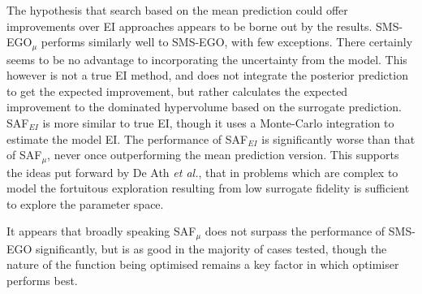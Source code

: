 \documentclass[conference]{IEEEtran}
\makeatletter
\newcommand\safmu{SAF$_{\mu}$\xspace}
\newcommand\safei{SAF$_{EI}$\xspace}
\newcommand\smsego{SMS-EGO\xspace}
\newcommand\smsegomu{SMS-EGO$_{\mu}$\xspace}
\newcommand\ei{EI\xspace}
\newcommand*{\etal}{\textit{et al.}\@\xspace}
\makeatother
\begin{document}
The hypothesis that search based on the mean prediction could offer improvements over \ei approaches appears to be borne out by the results. \smsegomu performs similarly well to \smsego, with few exceptions. There certainly seems to be no advantage to incorporating the uncertainty from the model. This however is not a true \ei method, and does not integrate the posterior prediction to get the expected improvement, but rather calculates the expected improvement to the dominated hypervolume based on the surrogate prediction. \safei is more similar to true \ei, though it uses a Monte-Carlo integration to estimate the model \ei. The performance of \safei is significantly worse than that of \safmu, never once outperforming the mean prediction version. This supports the ideas put forward by De Ath \etal \cite{death2019greed}, that in problems which are complex to model the fortuitous exploration resulting from low surrogate fidelity is sufficient to explore the parameter space.

It appears that broadly speaking \safmu does not surpass the performance of \smsego significantly, but is as good in the majority of cases tested, though the nature of the  function being optimised remains a key factor in which optimiser performs best. 
\end{document}
